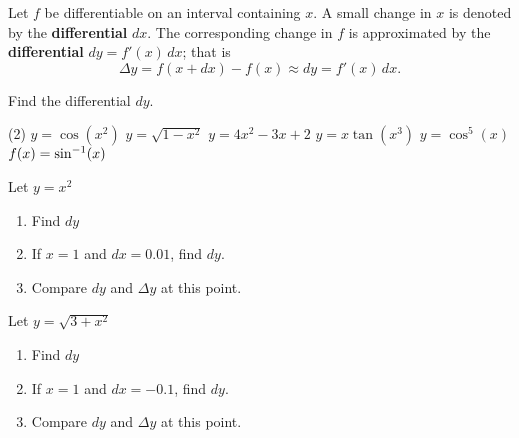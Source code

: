 \documentclass[answers]{exam}
\begin{document}
\noindent
{}
\pagebreak

\begin{defn*}[Differentials]
  
  Let $f$ be differentiable on an interval containing $x$. A small change in $x$ is denoted by the \textbf{differential} $dx$. The corresponding change in $f$ is approximated by the \textbf{differential} $dy=f'(x)\,dx$; that is
    $$\Delta y= f(x+dx)-f(x)\approx dy=f'(x)\,dx.$$
\end{defn*}

\begin{ex*}
  Find the differential $dy$.
\end{ex*}
\begin{tasks}[after-item-skip=\stretch{1}, label=~](2)
  \task $y=\cos(x^2)$
  \task $y=\sqrt{1-x^2}$
  \task $y=4x^2-3x+2$
  \task $y=x\tan(x^3)$
  \task $y=\cos^5(x)$
  \task $f(x)=\sin^{-1}(x)$
\end{tasks}
\pagebreak
\begin{ex*}
  Let $y=x^2$
\end{ex*}
\begin{enumerate}[label=\alph*), itemsep=\stretch{1}]
  \item Find $dy$
  \item If $x=1$ and $dx=0.01$, find $dy$.
  \item Compare $dy$ and $\Delta y$ at this point.
\end{enumerate}

\begin{ex*}
  Let $y=\sqrt{3+x^2}$
\end{ex*}
\begin{enumerate}[label=\alph*), itemsep=\stretch{1}]
  \item Find $dy$
  \item If $x=1$ and $dx=-0.1$, find $dy$.
  \item Compare $dy$ and $\Delta y$ at this point.
\end{enumerate}
\end{document}
